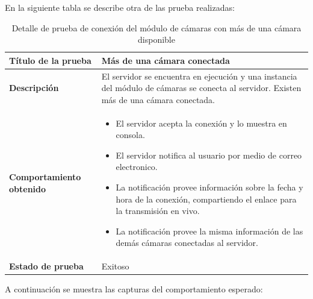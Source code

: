 En la siguiente tabla se describe otra de las prueba realizadas:\\

\begin{table}[H]
    \caption{Detalle de prueba de conexión del módulo de cámaras con más de una cámara disponible}
    \begin{center}
        \begin{tabular}{|>{\centering}p{}|m{}<{\centering}|} 
            \hline
            \textbf{Título de la prueba} & Más de una cámara conectada \\
            \hline
            \textbf{Descripción} & El servidor se encuentra en ejecución y una instancia del módulo de cámaras se conecta al servidor. Existen más de una cámara conectada.\\
            \hline
            \textbf{Comportamiento obtenido} & 
            \begin{itemize}
                \item El servidor acepta la conexión y lo muestra en consola.
                \item El servidor notifica al usuario por medio de correo electronico.
                \item La notificación provee información sobre la fecha y hora de la conexión, compartiendo el enlace para la transmisión en vivo.
                \item La notificación provee la misma información de las demás cámaras conectadas al servidor.
            \end{itemize} \\ 
            \hline
            \textbf{Estado de prueba} & Exitoso \\
            \hline
        \end{tabular}
    \end{center}
\end{table}

A continuación se muestra las capturas del comportamiento esperado:

